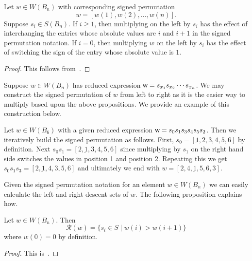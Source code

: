 \begin{proposition}
Let $w \in W(B_n)$ with corresponding signed permutation 
	\[w=[w(1),w(2), \ldots ,w(n)].\] Suppose $s_i \in S(B_n)$. If $i \geq 1$, then multiplying on the left by $s_i$ has the effect of interchanging the entries whose absolute values are $i$ and $i+1$ in the signed permutation notation. If $i=0$, then multiplying $w$ on the left by $s_i$ has the effect of switching the sign of the entry whose absolute value is $1$.
	\begin{proof}
	This follows from~\cite[Section 8.1 and A3.1]{Bjorner2005}.	
	\end{proof}
\end{proposition}

Suppose $w \in W(B_n)$ has reduced expression $\mathsf{w}=s_{x_1}s_{x_2}\cdots s_{x_n}$. We may construct the signed permutation of $w$ from left to right as it is the easier way to multiply based upon the above propositions. We provide an example of this construction below.

\begin{example}
Let $w \in W(B_6)$ with a given reduced expression $\mathsf{w}=s_0s_1s_3s_4s_5s_2$. Then we iteratively build the signed permutation as follows. First, $s_0=[\underbar{1},2,3,4,5,6]$ by definition. Next $s_0s_1=[2,\underbar{1},3,4,5,6]$ since multiplying by $s_1$ on the right hand side switches the values in position 1 and position 2. Repeating this we get $s_0s_1s_3=[2,\underbar{1},4,3,5,6]$ and ultimately we end with $w=[2,4,\underbar{1},5,6,3]$. 

\end{example}

Given the signed permutation notation for an element $w \in W(B_n)$ we can easily calculate the left and right descent sets of $w$. The following proposition explains how.

\begin{proposition}\label{prop:descent}
Let $w \in W(B_n)$. Then 
\[ \mathcal{R}(w)=\{s_i \in S \mid w(i) > w(i+1)\} \]
where $w(0)=0$ by definition.
\begin{proof}
	This is~\cite[Proposition 8.1.2]{Bjorner2005}.
\end{proof}
\end{proposition}

